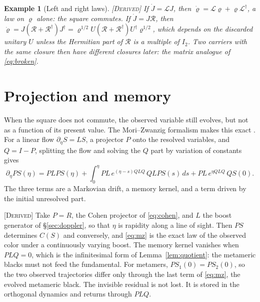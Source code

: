 \documentclass[11pt]{article}
\theoremstyle{boldplain}
\theoremstyle{boldupright}
\newtheorem{example}{Example}
\newcommand{\derived}{[\textup{\textsc{Derived}}]}
\begin{document}
\begin{example}[Left and right laws]\label{ex:laws}
\derived{} If $\dot J=\mathcal{L}J$, then $\dot\varrho=\mathcal{L}\varrho+\varrho\mathcal{L}^\dagger$, a law on $\varrho$ alone: the
square commutes. If $\dot J=J\mathcal{R}$, then $\dot\varrho=J(\mathcal{R}+\mathcal{R}^\dagger)J^\dagger=\varrho^{1/2}U(\mathcal{R}+\mathcal{R}^\dagger)U^\dagger\varrho^{1/2}$, which depends on the discarded
unitary $U$ unless the Hermitian part of $\mathcal{R}$ is a multiple of $I_2$. Two carriers with the same closure then have different closures
later: the matrix analogue of \eqref{eq:broken}.
\end{example}

\section{Projection and memory}\label{sec:memory}

When the square does not commute, the observed variable still evolves, but not as a function of its
present value. The Mori--Zwanzig formalism makes this exact \cite{zwanzig1961,mori1965}. For a linear flow $\partial_\eta S=LS$,
a projector $P$ onto the resolved variables, and $Q=I-P$, splitting the flow and solving the $Q$ part
by variation of constants gives
\begin{equation}\label{eq:mz}
\partial_\eta PS(\eta)=PLPS(\eta)+\int_0^\eta PL\,e^{(\eta-s)QLQ}\,QLPS(s)\,ds+PL\,e^{\eta QLQ}\,QS(0).
\end{equation}
The three terms are a Markovian drift, a memory kernel, and a term driven by the initial unresolved
part.

\derived{} Take $P=R$, the Cohen projector of \eqref{eq:cohen}, and $L$ the boost generator of \S\ref{sec:doppler}, so that
$\eta$ is rapidity along a line of sight. Then $PS$ determines $C(S)$ and conversely, and \eqref{eq:mz} is the exact
law of the observed color under a continuously varying boost. The memory kernel vanishes when
$PLQ=0$, which is the infinitesimal form of Lemma~\ref{lem:quotient}: the metameric blacks must not feed the
fundamental. For metamers, $PS_1(0)=PS_2(0)$, so the two observed trajectories differ only through
the last term of \eqref{eq:mz}, the evolved metameric black. The invisible residual is not lost. It is stored in
the orthogonal dynamics and returns through $PLQ$.
\end{document}

